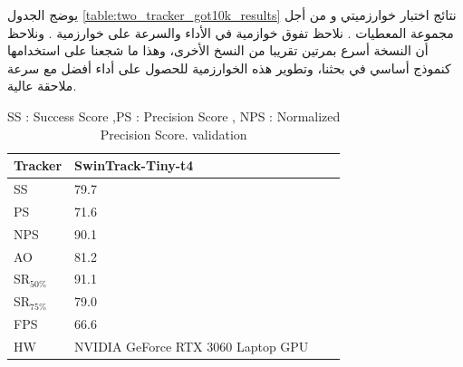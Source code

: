 \newline

 يوضج الجدول
 \ref{table:two_tracker_got10k_results}
نتائج اختبار خوارزميتي 
و
من أجل مجموعة المعطيات 
.
نلاحظ تفوق خوازمية
في الأداء والسرعة على خوارزمية
.
ونلاحظ أن النسخة
أسرع بمرتين تقريبا من النسخ الأخرى، وهذا ما شجعنا على استخدامها كنموذج أساسي في بحثنا، وتطوير هذه الخوارزمية للحصول على أداء أفضل مع سرعة ملاحقة عالية.
\iffalse
\begin{table}[H]
	\centering
	\begin{tabular}{||p{}||p{}||p{}||p{}||}
		\hline
		Tracker 	& SwinTrack-Tiny-t4 &\\
		\hline
		SS   		& 79.7 \\
		PS 			& 71.6 \\ 
		NPS 		& 90.1 \\ 
		AO 			& 81.2 \\ 
		SR$_{50\%}$ & 91.1 \\ 
		SR$_{75\%}$ & 79.0 \\
		FPS 		& 66.6\\
		HW 			& NVIDIA GeForce RTX 3060 Laptop GPU\\
		\hline
	\end{tabular}
	\caption{SS : Success Score ,PS : Precision Score , NPS : Normalized Precision Score.
	\newline
	validation}
	\label{table:1}
\end{table}

